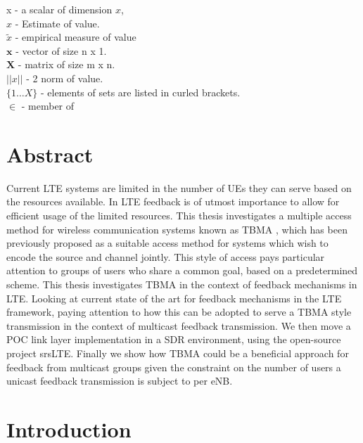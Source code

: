 \documentclass{article}
\begin{document}
x - a scalar of dimension $x$, \\
$\hat{x}$ - Estimate of value.\\
$\tilde{x}$ - empirical measure of value \\
$\boldsymbol{x}$ - vector of size n x 1.\\ 
$\boldsymbol{X}$ - matrix of size m x n.\\ 
$||x||$ - 2 norm of value. \\
$\{1 \dots X\}$ - elements of sets are listed in curled brackets.  \\
$\in$ - member of \\



\newpage

\section*{Abstract}
Current LTE systems are limited in the number of UEs they can serve based on the resources available. In LTE feedback is of utmost importance to allow for efficient usage of the limited resources. This thesis investigates a multiple access method for wireless communication systems known as \ac{TBMA} \cite{tbma}, which has been previously proposed as a suitable access method for systems which wish to encode the source and channel jointly. This style of access pays particular attention to groups of users who share a common goal, based on a predetermined scheme. This thesis investigates \ac{TBMA} in the context of feedback mechanisms in \ac{LTE}. Looking at current state of the art for feedback mechanisms in the LTE framework, paying attention to how this can be adopted to serve a \ac{TBMA} style transmission in the context of multicast feedback transmission. We then move a \ac{POC} link layer implementation in a \ac{SDR} environment, using the open-source project srsLTE. Finally we show how TBMA could be a beneficial approach for feedback from multicast groups given the constraint on the number of users a unicast feedback transmission is subject to per \ac{eNB}.  
\newpage

\section{Introduction}\label{intro}
\end{document}
